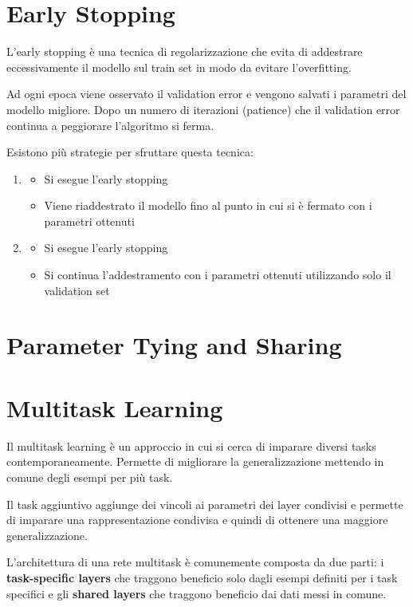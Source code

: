 \section{Early Stopping}
L'early stopping è una tecnica di regolarizzazione che evita di addestrare eccessivamente il modello sul train set in modo da evitare l'overfitting.

Ad ogni epoca viene osservato il validation error e vengono salvati i parametri del modello migliore.
Dopo un numero di iterazioni (patience) che il validation error continua a peggiorare l'algoritmo si ferma.

Esistono più strategie per sfruttare questa tecnica:
\begin{enumerate}
  \item {
        \begin{itemize}
          \item Si esegue l'early stopping
          \item Viene riaddestrato il modello fino al punto in cui si è fermato con i parametri ottenuti
        \end{itemize}
        }
  \item {
        \begin{itemize}
          \item Si esegue l'early stopping
          \item Si continua l'addestramento con i parametri ottenuti utilizzando solo il validation set
        \end{itemize}
        }
\end{enumerate}

\section{Parameter Tying and Sharing}


\section{Multitask Learning}
Il multitask learning è un approccio in cui si cerca di imparare diversi tasks contemporaneamente.
Permette di migliorare la generalizzazione mettendo in comune degli esempi per più task.

Il task aggiuntivo aggiunge dei vincoli ai parametri dei layer condivisi e permette di imparare una rappresentazione condivisa e quindi di ottenere una maggiore generalizzazione.

L'architettura di una rete multitask è comunemente composta da due parti:
i \textbf{task-specific layers} che traggono beneficio solo dagli esempi definiti per i task specifici e
gli \textbf{shared layers} che traggono beneficio dai dati messi in comune.

